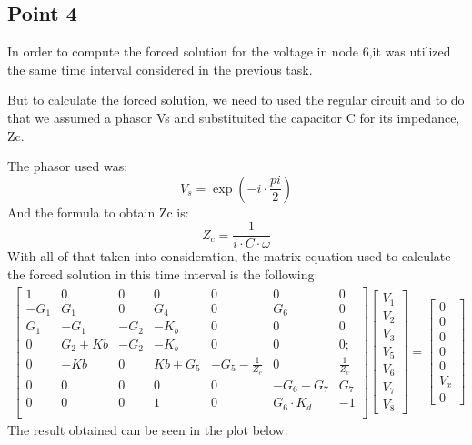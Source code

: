 \subsection{Point 4}
In order to compute the forced solution for the voltage in node 6,it was utilized the same time interval considered in the previous task.
\par But to calculate the forced solution, we need to used the regular circuit and to do that we assumed a phasor Vs and substituited the capacitor C for its impedance, Zc.
\par The phasor used was:
\begin{equation}
V_s = \exp(-i\cdot \frac{pi}{2})
\end{equation}
And the formula to obtain Zc is:
\begin{equation}
Z_c= \frac{1}{i\cdot C \cdot \omega}
\end{equation}
With all of that taken into consideration, the matrix equation used to calculate the forced solution in this time interval is the following:
\begin{gather}
	\begin{bmatrix}
		1 & 0 & 0 & 0 & 0 & 0 & 0 \\
		-G_1 & G_1 & 0 & G_4 & 0 & G_6 & 0 \\
		G_1 & -G_1 & -G_2 & -K_b & 0 & 0 & 0 \\
		0 & G_2+Kb & -G_2 & -K_b & 0 & 0 & 0;\\
               0 & -Kb & 0 & Kb+G_5 & -G_5-\frac{1}{Z_c} & 0 & \frac{1}{Z_c} \\
               0 & 0 & 0 & 0 & 0 & -G_6-G_7 & G_7\\
               0 & 0 & 0 & 1 & 0 & G_6\cdot K_d &-1\\
	\end{bmatrix}
	\begin {bmatrix} V_1 \\ V_2 \\ V_3 \\ V_5  \\ V_6 \\ V_7 \\ V_8 \end{bmatrix}
	=
	\begin {bmatrix} 0  \\ 0  \\ 0  \\ 0 \\ 0  \\ V_x \\ 0 \end{bmatrix}
\end{gather}
The result obtained can be seen in the plot below:

